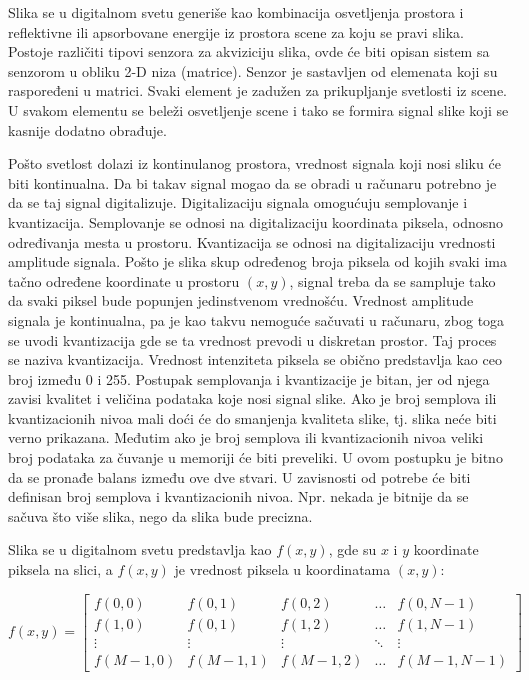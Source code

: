 \documentclass[a4paper,12pt,titlepage]{article}
\begin{document}
Slika se u digitalnom svetu generiše kao kombinacija osvetljenja prostora i reflektivne ili apsorbovane energije iz prostora scene za koju se pravi slika. Postoje različiti tipovi senzora za akviziciju slika, ovde će biti opisan sistem sa senzorom u obliku 2-D niza (matrice). Senzor je sastavljen od elemenata koji su raspoređeni u matrici. Svaki element je zadužen za prikupljanje svetlosti iz scene. U svakom elementu se beleži osvetljenje scene i tako se formira signal slike koji se kasnije dodatno obrađuje.

Pošto svetlost dolazi iz kontinulanog prostora, vrednost signala koji nosi sliku će biti kontinualna. Da bi takav signal mogao da se obradi u računaru potrebno je da se taj signal digitalizuje. Digitalizaciju signala omogućuju semplovanje i kvantizacija. Semplovanje se odnosi na digitalizaciju koordinata piksela, odnosno određivanja mesta u prostoru. Kvantizacija se odnosi na digitalizaciju vrednosti amplitude signala. Pošto je slika skup određenog broja piksela od kojih svaki ima tačno određene koordinate u prostoru $(x, y)$, signal treba da se sampluje tako da svaki piksel bude popunjen jedinstvenom vrednošću. Vrednost amplitude signala je kontinualna, pa je kao takvu nemoguće sačuvati u računaru, zbog toga se uvodi kvantizacija gde se ta vrednost prevodi u diskretan prostor. Taj proces se naziva kvantizacija. Vrednost intenziteta piksela se obično predstavlja kao ceo broj između 0 i 255. Postupak semplovanja i kvantizacije je bitan, jer od njega zavisi kvalitet i veličina podataka koje nosi signal slike. Ako je broj semplova ili kvantizacionih nivoa mali doći će do smanjenja kvaliteta slike, tj. slika neće biti verno prikazana. Međutim ako je broj semplova ili kvantizacionih nivoa veliki broj podataka za čuvanje u memoriji će biti preveliki. U ovom postupku je bitno da se pronađe balans između ove dve stvari. U zavisnosti od potrebe će biti definisan broj semplova i kvantizacionih nivoa. Npr. nekada je bitnije da se sačuva što više slika, nego da slika bude precizna. 

Slika se u digitalnom svetu predstavlja kao $f(x, y)$, gde su $x$ i $y$ koordinate piksela na slici, a $f(x, y)$ je vrednost piksela u koordinatama $(x, y)$:

\begin{equation}\label{eq:slika}
f(x, y)
=
\begin{bmatrix}
f(0, 0) & f(0, 1) & f(0, 2) & \dots & f(0, N - 1) \\
f(1, 0) & f(0, 1) & f(1, 2) & \dots & f(1, N - 1) \\
\vdots & \vdots & \vdots & \ddots & \vdots \\
f(M - 1, 0) & f(M - 1, 1) & f(M - 1, 2) & \dots & f(M - 1, N - 1)
\end{bmatrix}
\end{equation}
\end{document}
